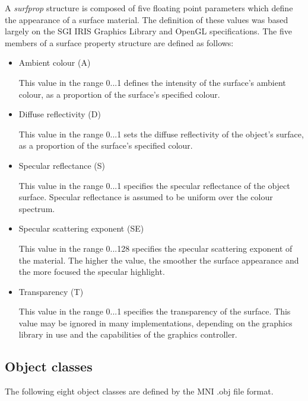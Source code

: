 \documentclass{article}
\begin{document}
A {\it surfprop} structure is composed of five floating point
parameters which define the appearance of a surface material. The
definition of these values was based largely on the SGI IRIS Graphics
Library and OpenGL specifications.  The five members of a surface
property structure are defined as follows:
\begin{itemize}
\item Ambient colour (A)

This value in the range 0...1 defines the intensity of the surface's
ambient colour, as a proportion of the surface's specified colour.

\item Diffuse reflectivity (D)

This value in the range 0...1 sets the diffuse reflectivity of the
object's surface, as a proportion of the surface's specified colour.

\item Specular reflectance (S)

This value in the range 0...1 specifies the specular reflectance of the
object surface.  Specular reflectance is assumed to be uniform over the
colour spectrum.

\item Specular scattering exponent (SE)

This value in the range 0...128 specifies the specular scattering
exponent of the material.  The higher the value, the smoother the
surface appearance and the more focused the specular highlight.

\item Transparency (T)

This value in the range 0...1 specifies the transparency of the surface.
This value may be ignored in many implementations, depending on the
graphics library in use and the capabilities of the graphics controller.

\end{itemize}

\subsection{Object classes}

The following eight object classes are defined by the MNI .obj file
format.
\end{document}

